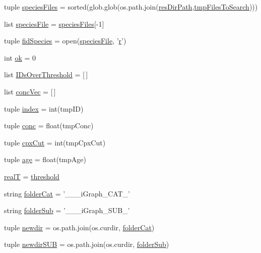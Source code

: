 \begin{DoxyCompactItemize}
\item 
tuple \hyperlink{a00102_a4f47408478e9a0590d016df50cf42141}{species\-Files} = sorted(glob.\-glob(os.\-path.\-join(\hyperlink{a00102_a9ededb3cd7c63befde39ad68e5f9e006}{res\-Dir\-Path},\hyperlink{a00102_a141356fc914110fdf3ec4f0fc3beaab5}{tmp\-Files\-To\-Search})))
\item 
list \hyperlink{a00102_a1d066fa24dced2da12ffd9a8514a17ba}{species\-File} = \hyperlink{a00102_a4f47408478e9a0590d016df50cf42141}{species\-Files}\mbox{[}-\/1\mbox{]}
\item 
tuple \hyperlink{a00102_aba2f982879776e057b35971b3653549e}{fid\-Species} = open(\hyperlink{a00102_a1d066fa24dced2da12ffd9a8514a17ba}{species\-File}, '\hyperlink{a00031_ac862e7284527eb913b1351c8bfb8e079}{r}')
\item 
int \hyperlink{a00102_a9ce833d782f17d858941cfa76914599a}{ok} = 0
\item 
list \hyperlink{a00102_a578f0f0f1e87579d73b11f8720610b1e}{I\-Ds\-Over\-Threshold} = \mbox{[}$\,$\mbox{]}
\item 
list \hyperlink{a00102_a1681853ab5f5859e51f219caa07a8539}{conc\-Vec} = \mbox{[}$\,$\mbox{]}
\item 
tuple \hyperlink{a00102_aaac3bb67a998c4a09aeed8f1adec2f9c}{index} = int(tmp\-I\-D)
\item 
tuple \hyperlink{a00102_a6ec435b19c74f79f32a0eae7bb2bd1c8}{conc} = float(tmp\-Conc)
\item 
tuple \hyperlink{a00102_a06673ec4592e44a89a443073b8a29011}{cpx\-Cut} = int(tmp\-Cpx\-Cut)
\item 
tuple \hyperlink{a00102_a98baad82b74a27e8b8c58aa985b7d374}{age} = float(tmp\-Age)
\item 
\hyperlink{a00102_a1c9b45f6074222ace96b7ab38cb8e23b}{real\-T} = \hyperlink{a00036_aa022cbb28f80299d572def08e7a5ccfd}{threshold}
\item 
string \hyperlink{a00102_a1cbfd083273176eebfe0260e8384acef}{folder\-Cat} = '\-\_\-\-\_\-\_\-i\-Graph\-\_\-\-C\-A\-T\-\_\-'
\item 
string \hyperlink{a00102_a90c2bcabbdb271c2c3347ebea4c259bc}{folder\-Sub} = '\-\_\-\-\_\-\_\-i\-Graph\-\_\-\-S\-U\-B\-\_\-'
\item 
tuple \hyperlink{a00102_a440179ca1c764cabcf9181985ae5dfb8}{newdir} = os.\-path.\-join(os.\-curdir, \hyperlink{a00102_a1cbfd083273176eebfe0260e8384acef}{folder\-Cat})
\item 
tuple \hyperlink{a00102_adb3b62d0896774bc87adfee19d047aa8}{newdir\-S\-U\-B} = os.\-path.\-join(os.\-curdir, \hyperlink{a00102_a90c2bcabbdb271c2c3347ebea4c259bc}{folder\-Sub})

\end{DoxyCompactItemize}
